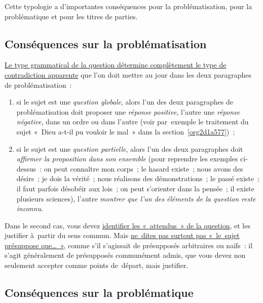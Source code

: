 \documentclass[a4paper,12pt]{report}
\begin{document}
Cette typologie a d'importantes conséquences pour la problématisation,
pour la problématique et pour les titres de parties.


\subsection{Conséquences sur la problématisation}
\label{sec:orgf4a45b4}

\uline{Le type grammatical de la question détermine complètement le type de
contradiction apparente} que l'on doit mettre au jour dans les deux
paragraphes de problématisation :

\begin{enumerate}
\item si le sujet est une \emph{question globale}, alors l'un des deux
paragraphes de problématisation doit proposer une \emph{réponse positive},
l'autre une \emph{réponse négative}, dans un ordre ou dans l'autre (voir
par exemple le traitement du sujet « Dieu a-t-il pu vouloir le mal »
dans la section \ref{org2d1a577}) ;

\item si le sujet est une \emph{question partielle}, alors l'un des deux
paragraphes doit \emph{affirmer la proposition dans son ensemble} (pour
reprendre les exemples ci-dessus : on peut connaître mon corps ; le
hasard existe ; nous avons des désirs ; je dois la vérité ; nous
réalisons des démonstrations ; le passé existe ; il faut parfois
désobéir aux lois ; on peut s'orienter dans la pensée ; il existe
plusieurs sciences), l'autre \emph{montrer que l'un des éléments de la
question reste inconnu}.
\end{enumerate}

Dans le second cas, vous devez \uline{identifier les « attendus » de la
question}, et les justifier à partir du sens commun. Mais \uline{ne dites pas
surtout pas « le sujet présuppose que\ldots{} »}, comme s'il s'agissait de
présupposés arbitraires ou naïfs : il s'agit généralement de présupposés
communément admis, que vous devez non seulement accepter comme points
de départ, mais justifier.


\subsection{Conséquences sur la problématique}
\label{sec:orgb70be37}
\end{document}
